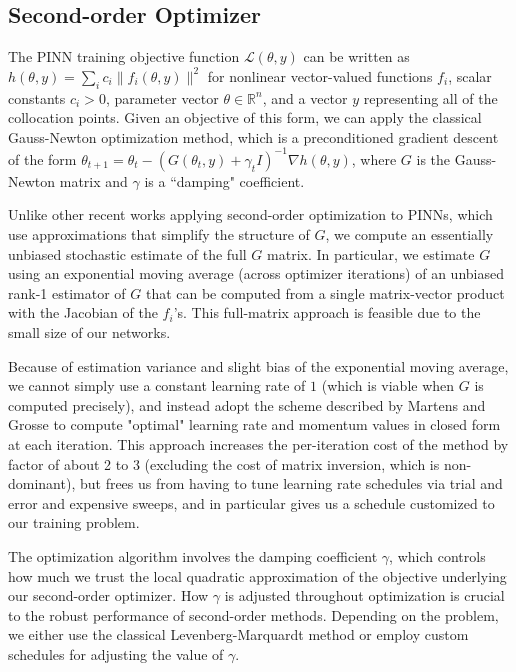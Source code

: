 \documentclass[fleqn,11pt]{wlscirep}
\begin{document}
\subsection*{Second-order Optimizer}
The PINN training objective function $\mathcal{L}(\theta, y)$ can be written as $h(\theta, y) = \sum_i c_i \|f_i(\theta, y)\|^2$ for nonlinear vector-valued functions $f_i$, scalar constants $c_i > 0$, parameter vector $\theta \in \mathbb{R}^n$, and a vector $y$ representing all of the collocation points. Given an objective of this form, we can apply the classical Gauss-Newton optimization method\cite{nocedal1999numerical}, which is a preconditioned gradient descent of the form $\theta_{t+1} = \theta_t - (G(\theta_t, y) + \gamma_t I)^{-1} \nabla h (\theta, y)$, where $G$ is the Gauss-Newton matrix and $\gamma$ is a ``damping" coefficient.

Unlike other recent works\cite{muller2023achieving,Jnini-Vella-Zeinhofer:gauss-newton-natural-gradient-pinn,dangel2024kronecker,rathore2024challenges,wang2025gradient} applying second-order optimization to PINNs, which use approximations that simplify the structure of $G$, we compute an essentially unbiased stochastic estimate of the full $G$ matrix. In particular, we estimate $G$ using an exponential moving average (across optimizer iterations) of an unbiased rank-1 estimator of $G$ that can be computed from a single matrix-vector product with the Jacobian of the $f_i$'s. This full-matrix approach is feasible due to the small size of our networks. 

Because of estimation variance and slight bias of the exponential moving average, we cannot simply use a constant learning rate of $1$ (which is viable when $G$ is computed precisely), and instead adopt the scheme described by Martens and Grosse\cite{martens2015optimizing} to compute "optimal" learning rate and momentum values in closed form at each iteration. This approach increases the per-iteration cost of the method by factor of about 2 to 3 (excluding the cost of matrix inversion, which is non-dominant), but frees us from having to tune learning rate schedules via trial and error and expensive sweeps, and in particular gives us a schedule customized to our training problem.

The optimization algorithm involves the damping coefficient $\gamma$, which controls how much we trust the local quadratic approximation of the objective underlying our second-order optimizer. How $\gamma$ is adjusted throughout optimization is crucial to the robust performance of second-order methods. Depending on the problem, we either use the classical Levenberg-Marquardt method \cite{levenberg1944method,marquardt1963algorithm} or employ custom schedules for adjusting the value of $\gamma$.
\end{document}
